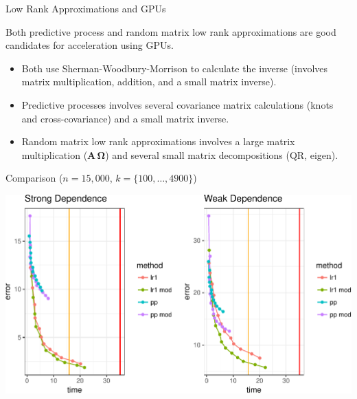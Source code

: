 \documentclass[11pt,ignorenonframetext,]{beamer}
\providecommand{\tightlist}{%
  \setlength{\itemsep}{0pt}\setlength{\parskip}{0pt}}
\begin{document}
\begin{frame}{Low Rank Approximations and GPUs}
\protect\hypertarget{low-rank-approximations-and-gpus}{}

Both predictive process and random matrix low rank approximations are
good candidates for acceleration using GPUs.

\vspace{3mm}

\begin{itemize}
\tightlist
\item
  Both use Sherman-Woodbury-Morrison to calculate the inverse (involves
  matrix multiplication, addition, and a small matrix inverse).
\end{itemize}

\vspace{3mm}

\begin{itemize}
\tightlist
\item
  Predictive processes involves several covariance matrix calculations
  (knots and cross-covariance) and a small matrix inverse.
\end{itemize}

\vspace{3mm}

\begin{itemize}
\tightlist
\item
  Random matrix low rank approximations involves a large matrix
  multiplication (\(\symbf{A}\,\symbf{\Omega}\)) and several small
  matrix decompositions (QR, eigen).
\end{itemize}

\end{frame}

\begin{frame}{Comparison (\(n=15,000\), \(k=\{100,\ldots,4900\}\))}
\protect\hypertarget{comparison-n15000-k100ldots4900}{}

\begin{center}\includegraphics[width=\textwidth]{Lec21_files/figure-beamer/unnamed-chunk-18-1} \end{center}

\end{frame}
\end{document}
